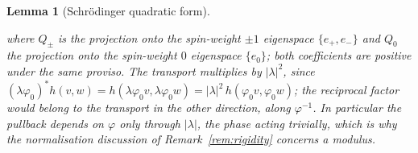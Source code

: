 \documentclass[11pt,a4paper]{article}
\newtheorem{lemma}[theorem]{Lemma}
\begin{document}
\begin{lemma}[Schr\"{o}dinger quadratic form]
\begin{enumerate}
\begin{equation}
        \end{equation}
        where $Q_{\pm}$ is the projection onto the spin-weight $\pm 1$ eigenspace $\{e_+, e_-\}$ and
        $Q_0$ the projection onto the spin-weight $0$ eigenspace $\{e_0\}$; both coefficients are
        positive under the same proviso.
        The transport multiplies by $|\lambda|^2$, since
        $(\lambda\varphi_0)^* h(v,w) = h(\lambda\varphi_0 v, \lambda\varphi_0 w)
        = |\lambda|^2\, h(\varphi_0 v, \varphi_0 w)$; the reciprocal factor would belong to the
        transport in the other direction, along $\varphi^{-1}$.
        In particular the pullback depends on $\varphi$ only through $|\lambda|$, the phase acting
        trivially, which is why the normalisation discussion of Remark~\ref{rem:rigidity} concerns
        a modulus.
      \end{enumerate}
    \end{lemma}
\end{document}
